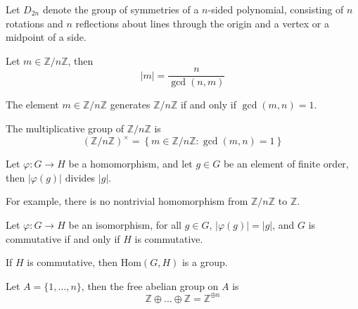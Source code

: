 \documentclass[openany]{book}
\newcommand{\Z}{\mathbb{Z}}
\begin{document}
\begin{defn}
    Let $D_{2n}$ denote the group of symmetries of a $n$-sided polynomial, consisting of $n$ rotations and $n$ reflections about lines through the origin and a vertex or a midpoint of a side.
\end{defn}

\begin{prop}
    Let $m\in\Z/n\Z$, then 
    \begin{equation*}
        |m|=\frac{n}{\gcd(n,m)}
    \end{equation*} 
\end{prop}

\begin{cor}
    The element $m\in\Z/n\Z$ generates $\Z/n\Z$ if and only if $\gcd(m,n)=1$.
\end{cor}


\begin{defn}[Multiplicative $(\Z/n\Z)^\times$]
    The multiplicative group of $\Z/n\Z$ is 
    \begin{equation*}
        \left(\Z/n\Z\right)^\times=\left\{m\in\Z/n\Z: \gcd(m,n)=1\right\}
    \end{equation*}
\end{defn}

\begin{prop}
    Let $\varphi:G\to H$ be a homomorphism, and let $g\in G$ be an element of finite order, then $|\varphi(g)|$ divides $|g|$.

    For example, there is no nontrivial homomorphism from $\Z/n\Z$ to $\Z$.
\end{prop}


\begin{prop}
    Let $\varphi: G\to H$ be an isomorphism, for all $g\in G$, $|\varphi(g)|=|g|$, and $G$ is commutative if and only if $H$ is commutative.
\end{prop}

\begin{prop}
    If $H$ is commutative, then $\text{Hom}(G,H) $ is a group.
\end{prop}

\begin{defn}
    Let $A=\{1,\dots, n\}$, then the free abelian group on $A$ is 
    \begin{equation*}
        \Z\oplus\dots\oplus\Z=\Z^{\oplus n}
    \end{equation*}
\end{defn}
\end{document}
